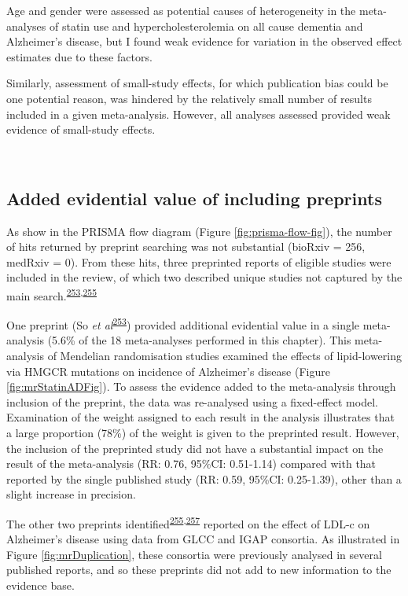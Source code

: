 \documentclass[a4paper, twoside]{templates/ociamthesis}
\begin{document}
Age and gender were assessed as potential causes of heterogeneity in the meta-analyses of statin use and hypercholesterolemia on all cause dementia and Alzheimer's disease, but I found weak evidence for variation in the observed effect estimates due to these factors.

Similarly, assessment of small-study effects, for which publication bias could be one potential reason, was hindered by the relatively small number of results included in a given meta-analysis. However, all analyses assessed provided weak evidence of small-study effects.

~

\hypertarget{sys-rev-including-preprints-res}{%
\subsection{Added evidential value of including preprints}\label{sys-rev-including-preprints-res}}

As show in the PRISMA flow diagram (Figure \ref{fig:prisma-flow-fig}), the number of hits returned by preprint searching was not substantial (bioRxiv = 256, medRxiv = 0). From these hits, three preprinted reports of eligible studies were included in the review, of which two described unique studies not captured by the main search.\textsuperscript{\protect\hyperlink{ref-so2017}{253},\protect\hyperlink{ref-andrews2019}{255}}

One preprint (So \emph{et al}\textsuperscript{\protect\hyperlink{ref-so2017}{253}}) provided additional evidential value in a single meta-analysis (5.6\% of the 18 meta-analyses performed in this chapter). This meta-analysis of Mendelian randomisation studies examined the effects of lipid-lowering via HMGCR mutations on incidence of Alzheimer's disease (Figure \ref{fig:mrStatinADFig}). To assess the evidence added to the meta-analysis through inclusion of the preprint, the data was re-analysed using a fixed-effect model. Examination of the weight assigned to each result in the analysis illustrates that a large proportion (78\%) of the weight is given to the preprinted result. However, the inclusion of the preprinted study did not have a substantial impact on the result of the meta-analysis (RR: 0.76, 95\%CI: 0.51-1.14) compared with that reported by the single published study (RR: 0.59, 95\%CI: 0.25-1.39), other than a slight increase in precision.

The other two preprints identified\textsuperscript{\protect\hyperlink{ref-andrews2019}{255},\protect\hyperlink{ref-zhu2017}{257}} reported on the effect of LDL-c on Alzheimer's disease using data from GLCC and IGAP consortia. As illustrated in Figure \ref{fig:mrDuplication}, these consortia were previously analysed in several published reports, and so these preprints did not add to new information to the evidence base.
\end{document}
